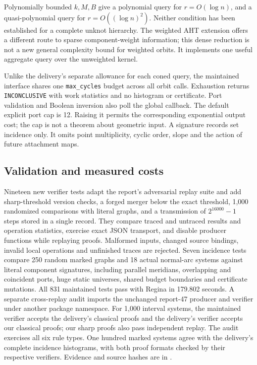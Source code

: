 Polynomially bounded $k,M,B$ give a polynomial query for $r=O(\log n)$,
and a quasi-polynomial query for $r=O((\log n)^2)$. Neither condition has
been established for a complete unknot hierarchy. The weighted AHT
extension offers a different route to sparse component-weight information;
this dense reduction is not a new general complexity bound for weighted
orbits. It implements one useful aggregate query over the unweighted kernel.

Unlike the delivery's separate allowance for each coned query, the maintained
interface shares one \texttt{max\_cycles} budget across all orbit calls.
Exhaustion returns \texttt{INCONCLUSIVE} with work statistics and no histogram
or certificate. Port validation and Boolean inversion also poll the global
callback. The default explicit port cap is 12. Raising it permits the
corresponding exponential output cost; the cap is not a theorem about
geometric input. A signature records set incidence only. It omits point
multiplicity, cyclic order, slope and the action of future attachment maps.

\subsection{Validation and measured costs}

Nineteen new verifier tests adapt the report's adversarial replay suite and
add sharp-threshold version checks, a forged merger below the exact threshold,
1,000 randomized comparisons with literal graphs, and a transmission of
$2^{16000}-1$ steps stored in a single record. They compare traced and
untraced results and operation statistics, exercise exact JSON transport,
and disable producer functions while replaying proofs. Malformed inputs,
changed source bindings, invalid local operations and unfinished traces
are rejected. Seven incidence tests compare 250 random marked graphs and
18 actual normal-arc systems against literal component signatures, including
parallel meridians, overlapping and coincident ports, huge static universes,
shared budget boundaries and certificate mutations.
All 831 maintained tests pass with Regina in 179.802 seconds. A separate
cross-replay audit imports the unchanged report-47 producer and verifier
under another package namespace. For 1,000 interval systems, the maintained
verifier accepts the delivery's classical proofs and the delivery's verifier
accepts our classical proofs; our sharp proofs also pass independent replay.
The audit exercises all six rule types. One hundred marked systems agree
with the delivery's complete incidence histograms, with both proof formats
checked by their respective verifiers. Evidence and source hashes are in
.

